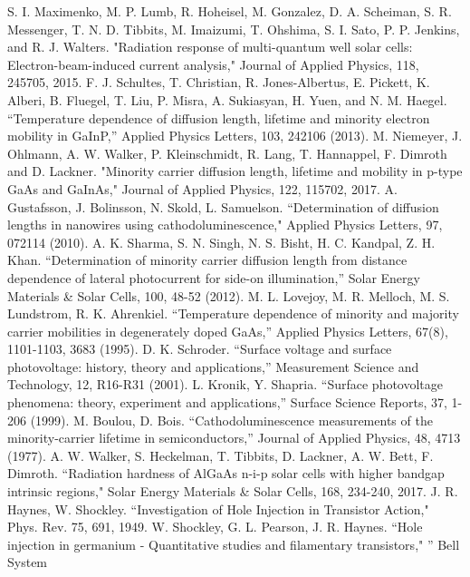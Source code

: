 \documentclass[aip,amsmath,amssymb,reprint]{revtex4-1}
\begin{document}
\begin{thebibliography}{99}
 S. I. Maximenko, M. P. Lumb, R. Hoheisel, M. Gonzalez, D. A. Scheiman, S. R. Messenger, T. N. D. Tibbits, M.
Imaizumi, T. Ohshima, S. I. Sato, P. P. Jenkins, and R. J. Walters. "Radiation response of multi-quantum well solar cells: Electron-beam-induced current
analysis," Journal of Applied Physics, 118, 245705, 2015.
 F. J. Schultes, T. Christian, R. Jones-Albertus, E. Pickett,  K. Alberi, B. Fluegel, T. Liu, P. Misra, A. Sukiasyan, H. Yuen, and N. M. Haegel. ``Temperature dependence of diffusion length, lifetime and minority electron mobility in GaInP,'' Applied Physics Letters, 103, 242106 (2013).
 M. Niemeyer, J. Ohlmann, A. W. Walker, P. Kleinschmidt, R. Lang, T. Hannappel, F. Dimroth and D. Lackner. "Minority carrier diffusion length, lifetime and mobility in p-type GaAs and GaInAs," Journal of Applied Physics, 122, 115702, 2017.
 A. Gustafsson, J. Bolinsson, N. Skold, L. Samuelson. ``Determination of diffusion lengths in nanowires using cathodoluminescence," Applied Physics Letters, 97, 072114 (2010).
 A. K. Sharma, S. N. Singh, N. S. Bisht, H. C. Kandpal, Z. H. Khan.  ``Determination of minority carrier diffusion length from distance dependence of lateral photocurrent for side-on illumination,'' Solar Energy Materials \& Solar Cells, 100, 48-52 (2012).
 M. L. Lovejoy, M. R. Melloch, M. S. Lundstrom, R. K. Ahrenkiel.  ``Temperature dependence of minority and majority carrier mobilities
in degenerately doped GaAs,'' Applied Physics Letters, 67(8), 1101-1103, 3683 (1995).
 D. K. Schroder. ``Surface voltage and surface photovoltage: history, theory and applications,'' Measurement Science and Technology, 12, R16-R31 (2001).
 L. Kronik, Y. Shapria. ``Surface photovoltage phenomena:  theory, experiment and applications,'' Surface Science Reports, 37, 1-206 (1999).
 M. Boulou, D. Bois. ``Cathodoluminescence measurements of the minority-carrier lifetime in semiconductors,'' Journal of Applied Physics, 48, 4713 (1977).
 A. W. Walker, S. Heckelman, T. Tibbits, D. Lackner, A. W. Bett, F. Dimroth. ``Radiation hardness of AlGaAs n-i-p solar cells with higher bandgap intrinsic regions," Solar Energy Materials \& Solar Cells, 168, 234-240, 2017.
 J. R. Haynes, W. Shockley. ``Investigation of Hole Injection in Transistor Action," Phys. Rev. 75, 691, 1949. 
 W. Shockley, G. L. Pearson, J. R. Haynes. ``Hole injection in germanium - Quantitative studies and filamentary transistors," ” Bell System

\end{thebibliography}
\end{document}
